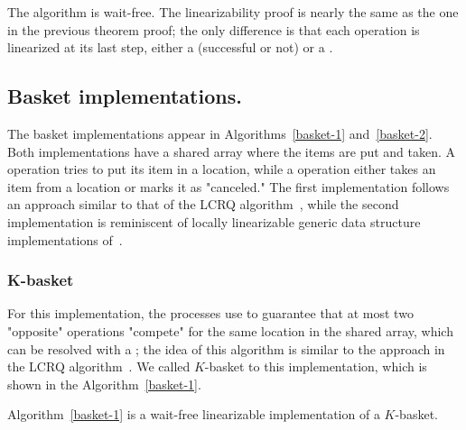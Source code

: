 \begin{proofT}
  The algorithm is wait-free. The linearizability proof is nearly the same as the one in the previous theorem proof; the only difference is that each \IC operation is linearized at its last step, either a \CAS (successful or not) or a \R.
\end{proofT}

\subsection{\label{subsec:basket-implementation}Basket implementations.}
The basket implementations appear in Algorithms~\ref{basket-1} and~\ref{basket-2}. Both implementations have a shared array where the items are put and taken. A \Put operation tries to put its item in a location, while a \Take operation either takes an item from a location or marks it as "canceled."  The first implementation follows an approach similar to that of the LCRQ algorithm~\cite{ppopp2013x86queues}, while the second implementation is reminiscent of locally linearizable generic data structure implementations of~\cite{DBLP_conf_concur_HaasHHKLPSSV16}.

\subsubsection{K-basket}

For this implementation, the processes use \FAI to guarantee that at most two "opposite" operations "compete" for the same location in the shared array, which can be resolved with a \SWAP; the idea of this algorithm is similar to the approach in the LCRQ algorithm~\cite{ppopp2013x86queues}. We called \(K\)-basket to this implementation, which is shown in the Algorithm~\ref{basket-1}.

\begin{theorem}\label{theorem:k-basket}
Algorithm~\ref{basket-1} is a wait-free linearizable implementation of a $K$-basket.
\end{theorem}

